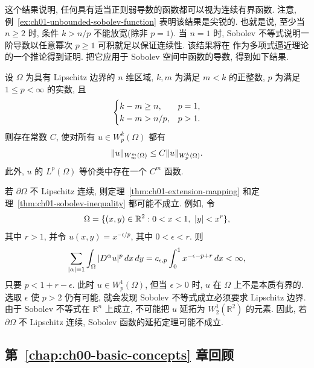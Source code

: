 这个结果说明, 任何具有适当正则弱导数的函数都可以视为连续有界函数. 注意, 例~\ref{ex:ch01-unbounded-sobolev-function} 表明该结果是尖锐的. 也就是说, 至少当 $n\geq2$ 时, 条件 $k>n/p$ 不能放宽(除非 $p=1$). 当 $n=1$ 时, Sobolev 不等式说明一阶导数以任意幂次 $p\geq1$ 可积就足以保证连续性. 该结果将在  作为多项式逼近理论的一个推论得到证明. 把它应用于 Sobolev 空间中函数的导数, 得到如下结果.

\begin{Corollary}
\label{cor:ch01-sobolev-derivative-embedding}
设 $\Omega$ 为具有 Lipschitz 边界的 $n$ 维区域, $k,m$ 为满足 $m<k$ 的正整数, $p$ 为满足 $1\leq p<\infty$ 的实数, 且
\[
\MathBookFormulaID{formula-ch01-sobolev-corollary-conditions}
\begin{cases}
k-m\geq n,&p=1,\\
k-m>n/p,&p>1.
\end{cases}
\]
则存在常数 $C$, 使对所有 $u\in W_p^k(\Omega)$ 都有
\[
\MathBookFormulaID{formula-ch01-sobolev-corollary-bound}
\|u\|_{W_\infty^m(\Omega)}\leq C\|u\|_{W_p^k(\Omega)}.
\]
此外, $u$ 的 $L^p(\Omega)$ 等价类中存在一个 $C^m$ 函数.
\end{Corollary}

\begin{Remark}
\label{rem:ch01-cusp-counterexample}
若 $\partial\Omega$ 不 Lipschitz 连续, 则定理~\ref{thm:ch01-extension-mapping} 和定理~\ref{thm:ch01-sobolev-inequality} 都可能不成立. 例如, 令
\[
\MathBookFormulaID{formula-ch01-cusp-domain}
\Omega=\{(x,y)\in\mathbb R^2:0<x<1,\ |y|<x^r\},
\]
其中 $r>1$, 并令 $u(x,y)=x^{-\epsilon/p}$, 其中 $0<\epsilon<r$. 则
\[
\MathBookFormulaID{formula-ch01-cusp-derivative-integral}
\sum_{|\alpha|=1}\int_\Omega|D^\alpha u|^p\,dx\,dy
=c_{\epsilon,p}\int_0^1x^{-\epsilon-p+r}\,dx<\infty,
\]
只要 $p<1+r-\epsilon$. 此时 $u\in W_p^1(\Omega)$, 但当 $\epsilon>0$ 时, $u$ 在 $\Omega$ 上不是本质有界的. 选取 $\epsilon$ 使 $p>2$ 仍有可能, 就会发现 Sobolev 不等式成立必须要求 Lipschitz 边界. 由于 Sobolev 不等式在 $\mathbb R^n$ 上成立, 不可能把 $u$ 延拓为 $W_2^1(\mathbb R^2)$ 的元素. 因此, 若 $\partial\Omega$ 不 Lipschitz 连续, Sobolev 函数的延拓定理可能不成立.
\end{Remark}

\subsection{第~\ref{chap:ch00-basic-concepts} 章回顾}
\label{sec:ch01-review-chapter-zero}

